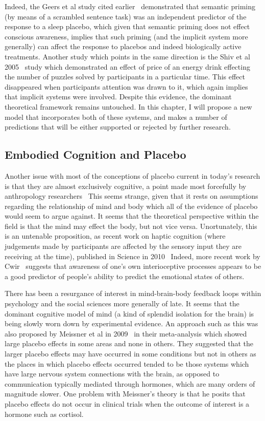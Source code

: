 Indeed, the Geers et al study cited earlier~\cite{Geers2005} demonstrated that semantic priming (by means of a scrambled sentence task) was an independent predictor of the response to a sleep placebo, which given that semantic priming does not effect conscious awareness, implies that such priming (and the implicit system more generally) can affect the response to placebos and indeed biologically active treatments. Another study which points in the same direction is the Shiv et al 2005~\cite{Shiv2005a} study which demonstrated an effect of price of an energy drink effecting the number of puzzles solved by participants in a particular time. This effect disappeared when participants attention was drawn to it, which again implies that implicit systems were involved. Despite this evidence, the dominant theoretical framework remains untouched. In this chapter, I will propose a new model that incorporates both of these systems, and makes a number of predictions that will be either supported or rejected by further research. 

\subsection{Embodied Cognition and Placebo}
\label{sec:embod-cogn-plac}
Another issue with most of the conceptions of placebo current in today's research is that they are almost exclusively cognitive, a point made most forcefully by anthropology researchers~\cite{Thompson2009}  %
This seems strange, given that it rests on assumptions regarding the relationship of mind and body which all of the evidence of placebo would seem to argue against. It seems that the theoretical perspective within the field is that the mind may effect the body, but not vice versa. Unortunately, this is an untenable proposition, as recent work on haptic cognition (where judgements made by participants are affected by the sensory input they are receiving at the time), published in Science in 2010~\cite{ackerman2010incidental}
Indeed, more recent work by Cwir~\cite{Cwir2011} suggests that awareness of one's own interioceptive processes appears to be a good predictor of people's ability to predict the emotional states of others. 


There has been a resurgance of interest in mind-brain-body feedback loops within psychology and the social sciences more generally of late. It seems that the dominant cognitive model of mind (a kind of splendid isolation for the brain) is being slowly worn down by experimental evidence. An approach such as this was also proposed by Meissner et al in 2009~\cite{Meissner2009} in their meta-analysis which showed large placebo effects in some areas and none in others. They suggested that the larger placebo effects may have occurred in some conditions but not in others as the places in which placebo effects occurred tended to be those systems which have large nervous system connections with the brain, as opposed to communication typically mediated through hormones, which are many orders of magnitude slower. One problem with Meissner's theory is that he posits that placebo effects do not occur in clinical trials when the outcome of interest is a hormone such as cortisol. 

